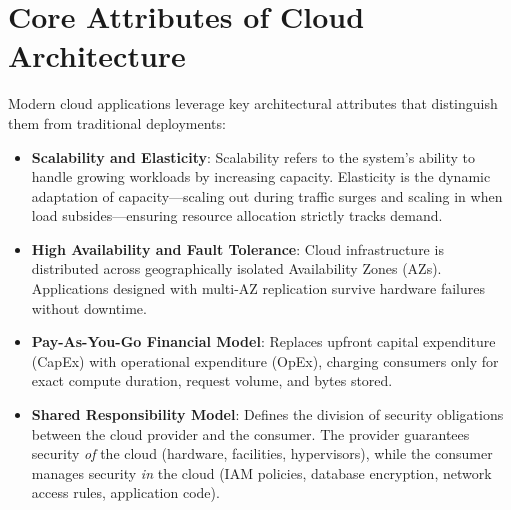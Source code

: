 \section{Core Attributes of Cloud Architecture}
Modern cloud applications leverage key architectural attributes that distinguish them from traditional deployments:
\begin{itemize}
    \item \textbf{Scalability and Elasticity}: Scalability refers to the system's ability to handle growing workloads by increasing capacity. Elasticity is the dynamic adaptation of capacity—scaling out during traffic surges and scaling in when load subsides—ensuring resource allocation strictly tracks demand.
    \item \textbf{High Availability and Fault Tolerance}: Cloud infrastructure is distributed across geographically isolated Availability Zones (AZs). Applications designed with multi-AZ replication survive hardware failures without downtime.
    \item \textbf{Pay-As-You-Go Financial Model}: Replaces upfront capital expenditure (CapEx) with operational expenditure (OpEx), charging consumers only for exact compute duration, request volume, and bytes stored.
    \item \textbf{Shared Responsibility Model}: Defines the division of security obligations between the cloud provider and the consumer. The provider guarantees security \textit{of} the cloud (hardware, facilities, hypervisors), while the consumer manages security \textit{in} the cloud (IAM policies, database encryption, network access rules, application code).
\end{itemize}

